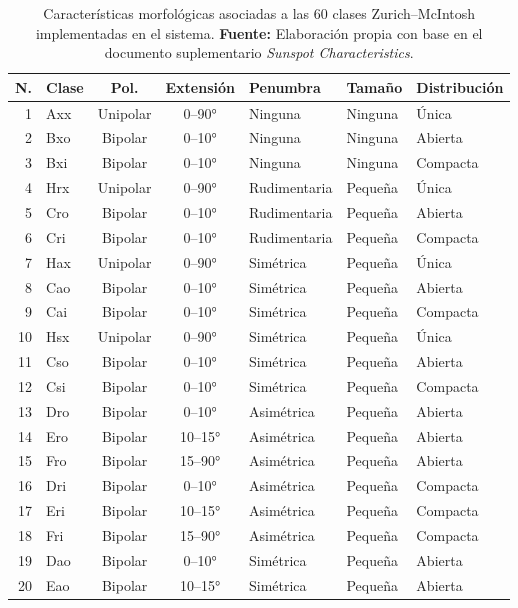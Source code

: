 \begin{appendices}
\begin{table}[H]
\centering
\caption{Características morfológicas asociadas a las 60 clases Zurich--McIntosh implementadas en el sistema. \textbf{Fuente:} Elaboración propia con base en el documento suplementario \textit{Sunspot Characteristics}.}
\label{tab:anexo-caracteristicas-zurich-mcintosh}
\scriptsize
\setlength{\tabcolsep}{3pt}
\renewcommand{\arraystretch}{1.04}
\begin{tabular}{r l c c l l l}
\toprule
\textbf{N.} & \textbf{Clase} & \textbf{Pol.} & \textbf{Extensión} & \textbf{Penumbra} & \textbf{Tamaño} & \textbf{Distribución} \\
\midrule
1 & Axx & Unipolar & 0--90° & Ninguna & Ninguna & Única \\
2 & Bxo & Bipolar & 0--10° & Ninguna & Ninguna & Abierta \\
3 & Bxi & Bipolar & 0--10° & Ninguna & Ninguna & Compacta \\
4 & Hrx & Unipolar & 0--90° & Rudimentaria & Pequeña & Única \\
5 & Cro & Bipolar & 0--10° & Rudimentaria & Pequeña & Abierta \\
6 & Cri & Bipolar & 0--10° & Rudimentaria & Pequeña & Compacta \\
7 & Hax & Unipolar & 0--90° & Simétrica & Pequeña & Única \\
8 & Cao & Bipolar & 0--10° & Simétrica & Pequeña & Abierta \\
9 & Cai & Bipolar & 0--10° & Simétrica & Pequeña & Compacta \\
10 & Hsx & Unipolar & 0--90° & Simétrica & Pequeña & Única \\
11 & Cso & Bipolar & 0--10° & Simétrica & Pequeña & Abierta \\
12 & Csi & Bipolar & 0--10° & Simétrica & Pequeña & Compacta \\
13 & Dro & Bipolar & 0--10° & Asimétrica & Pequeña & Abierta \\
14 & Ero & Bipolar & 10--15° & Asimétrica & Pequeña & Abierta \\
15 & Fro & Bipolar & 15--90° & Asimétrica & Pequeña & Abierta \\
16 & Dri & Bipolar & 0--10° & Asimétrica & Pequeña & Compacta \\
17 & Eri & Bipolar & 10--15° & Asimétrica & Pequeña & Compacta \\
18 & Fri & Bipolar & 15--90° & Asimétrica & Pequeña & Compacta \\
19 & Dao & Bipolar & 0--10° & Simétrica & Pequeña & Abierta \\
20 & Eao & Bipolar & 10--15° & Simétrica & Pequeña & Abierta \\
\bottomrule
\end{tabular}
\end{table}


\end{appendices}
